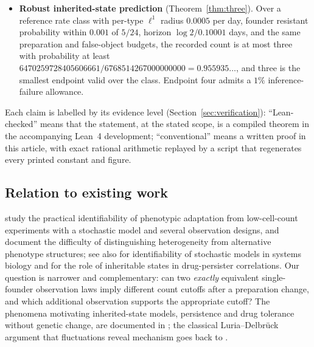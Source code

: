 \documentclass[11pt,a4paper]{article}
\theoremstyle{plain}
\theoremstyle{definition}
\theoremstyle{remark}
\begin{document}
\begin{itemize}
\item \textbf{Robust inherited-state prediction} (Theorem~\ref{thm:three}). Over a reference rate class with per-type $\ell^1$ radius $0.0005$ per day, founder resistant probability within $0.001$ of $5/24$, horizon $\log 2/0.10001$ days, and the same preparation and false-object budgets, the recorded count is at most three with probability at least $6470259728405606661/6768514267000000000=0.955935\ldots$, and three is the smallest endpoint valid over the class. Endpoint four admits a $1\%$ inference-failure allowance.
\end{itemize}
Each claim is labelled by its evidence level (Section~\ref{sec:verification}): ``Lean-checked'' means that the statement, at the stated scope, is a compiled theorem in the accompanying Lean~4 development; ``conventional'' means a written proof in this article, with exact rational arithmetic replayed by a script that regenerates every printed constant and figure.

\subsection{Relation to existing work}
\citet{browning2025} study the practical identifiability of phenotypic adaptation from low-cell-count experiments with a stochastic model and several observation designs, and document the difficulty of distinguishing heterogeneity from alternative phenotype structures; see also \citet{browning2020} for identifiability of stochastic models in systems biology and \citet{iyer2025} for the role of inheritable states in drug-persister correlations. Our question is narrower and complementary: can two \emph{exactly} equivalent single-founder observation laws imply different count cutoffs after a preparation change, and which additional observation supports the appropriate cutoff? The phenomena motivating inherited-state models, persistence and drug tolerance without genetic change, are documented in \citet{balaban2004,sharma2010,shaffer2017}; the classical Luria--Delbr\"uck argument that fluctuations reveal mechanism goes back to \citet{luria1943}.
\end{document}
